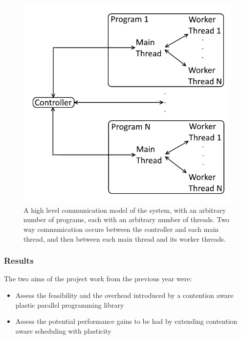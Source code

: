 \begin{itemize}
        \begin{figure}[H]
            \includegraphics[width=1\textwidth]{graphics/communication_structure.png}
            \caption{A high level communication model of the system, with an arbitrary number of programs, each with an arbitrary number of threads. Two way communication occurs between the controller and each main thread, and then between each main thread and its worker threads.}
            \label{fig:old_communication_structure}
        \end{figure}
\end{itemize}



\subsubsection{Results}
\label{section:background:results}

The two aims of the project work from the previous year were:

\begin{itemize}
    \item Assess the feasibility and the overhead introduced by a contention aware plastic parallel programming library
    
    \item Assess the potential performance gains to be had by extending contention aware scheduling with plasticity
\end{itemize}

